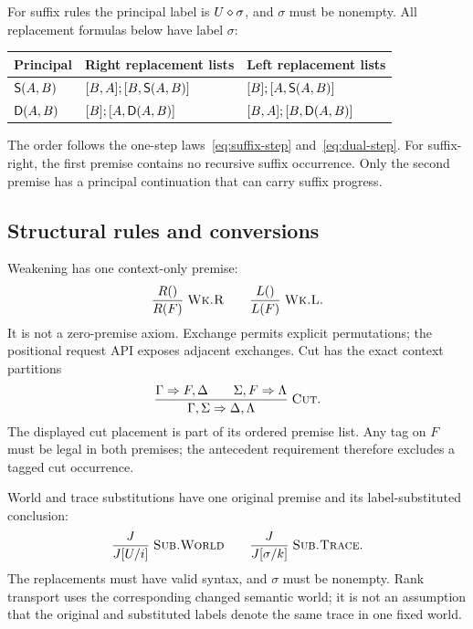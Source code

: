 For suffix rules the principal label is $U\jlabel\sigma$, and $\sigma$ must
be nonempty. All replacement formulas below have label $\sigma$:
\begin{center}
\begin{tabular}{@{}lll@{}}
\toprule
Principal & Right replacement lists & Left replacement lists\\
\midrule
$\Suf{A}{B}$ & $[B,A];[B,\Suf{A}{B}]$ & $[B];[A,\Suf{A}{B}]$\\
$\DSuf{A}{B}$ & $[B];[A,\DSuf{A}{B}]$ & $[B,A];[B,\DSuf{A}{B}]$\\
\bottomrule
\end{tabular}
\end{center}

The order follows the one-step laws~\eqref{eq:suffix-step}
and~\eqref{eq:dual-step}. For suffix-right, the first premise contains no
recursive suffix occurrence. Only the second premise has a principal
continuation that can carry suffix progress.

\subsection{Structural rules and conversions}
Weakening has one context-only premise:
\[
 \Rule{Wk.R}{R()}{R(F)}\qquad\Rule{Wk.L}{L()}{L(F)}.
\]
It is not a zero-premise axiom. Exchange permits explicit permutations;
the positional request API exposes adjacent exchanges. Cut has the exact
context partitions
\[
 \Rule{Cut}{\seq{\Gamma}{F,\Delta}\qquad\seq{\Sigma,F}{\Lambda}}
   {\seq{\Gamma,\Sigma}{\Delta,\Lambda}}.
\]
The displayed cut placement is part of its ordered premise list. Any tag
on $F$ must be legal in both premises; the antecedent requirement therefore
excludes a tagged cut occurrence.

World and trace substitutions have one original premise and its
label-substituted conclusion:
\[
 \Rule{Sub.World}{J}{J[U/i]}
 \qquad
 \Rule{Sub.Trace}{J}{J[\sigma/k]}.
\]
The replacements must have valid syntax, and $\sigma$ must be nonempty.
Rank transport uses the corresponding changed semantic world; it is not an
assumption that the original and substituted labels denote the same trace
in one fixed world.


